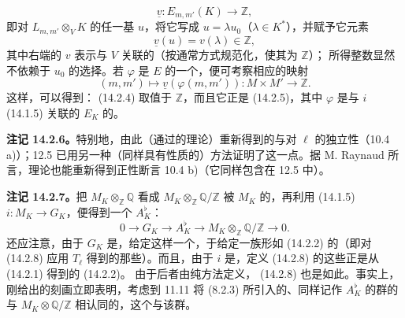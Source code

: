 \[
\underline v:E_{m,m'}(K)\longrightarrow\mathbb Z,
\]
即对 $L_{m,m'}\otimes_VK$ 的任一基 $u$，将它写成 $u=\lambda u_0$（$\lambda\in K^*$），并赋予它元素
\[
\underline v(u)=v(\lambda)\in\mathbb Z,
\]
其中右端的 $v$ 表示与 $V$ 关联的（按通常方式规范化，使其为 $\mathbb Z$）；
所得整数显然不依赖于 $u_0$ 的选择。若 $\varphi$ 是 $E$ 的一个，便可考察相应的映射
\begin{equation}\tag{14.2.5}
(m,m')\longmapsto\underline v(\varphi(m,m')):M\times M'\longrightarrow\mathbb Z.
\end{equation}
这样，可以得到： (14.2.4) 取值于 $\mathbb Z$，而且它正是 (14.2.5)，其中 $\varphi$ 是与 $i$ (14.1.5) 关联的 $E_K$ 的。

\textbf{注记 14.2.6。}特别地，由此（通过的理论）重新得到的与对 $\ell$ 的独立性（10.4 a)）；12.5 已用另一种（同样具有性质的）方法证明了这一点。据 M. Raynaud 所言，理论也能重新得到正性断言 10.4 b)（它同样包含在 12.5 中）。

\textbf{注记 14.2.7。}把 $M_K\otimes_{\mathbb Z}\mathbb Q$ 看成 $M_K\otimes_{\mathbb Z}\mathbb Q/\mathbb Z$ 被 $M_K$ 的，再利用 (14.1.5) $i:M_K\to G_K$，便得到一个 $A_K^\flat$：
\begin{equation}\tag{14.2.8}
0\longrightarrow G_K\longrightarrow A_K^\flat\longrightarrow
M_K\otimes_{\mathbb Z}\mathbb Q/\mathbb Z\longrightarrow0.
\end{equation}
还应注意，由于 $G_K$ 是，给定这样一个，于给定一族形如 (14.2.2) 的（即对 (14.2.8) 应用 $T_\ell$ 得到的那些）。而且，由于 $i$ 是，定义 (14.2.8) 的这些正是从 (14.2.1) 得到的 (14.2.2)。
由于后者由纯方法定义， (14.2.8) 也是如此。事实上，刚给出的刻画立即表明，考虑到 11.11 将 (8.2.3) 所引入的、同样记作 $A_K^\flat$ 的群的与 $M_K\otimes\mathbb Q/\mathbb Z$ 相认同的，这个与该群。


